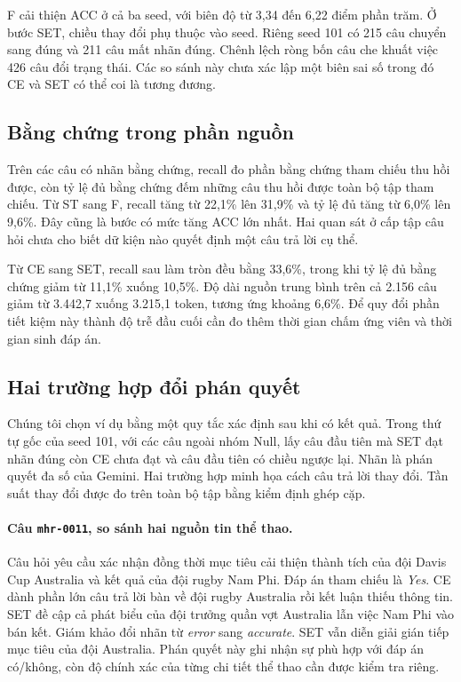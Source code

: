 F cải thiện ACC ở cả ba seed, với biên độ từ 3,34 đến 6,22 điểm phần trăm. Ở bước SET, chiều thay đổi phụ thuộc vào seed. Riêng seed 101 có 215 câu chuyển sang đúng và 211 câu mất nhãn đúng. Chênh lệch ròng bốn câu che khuất việc 426 câu đổi trạng thái. Các so sánh này chưa xác lập một biên sai số trong đó CE và SET có thể coi là tương đương.

\subsection{Bằng chứng trong phần nguồn}
Trên các câu có nhãn bằng chứng, recall đo phần bằng chứng tham chiếu thu hồi được, còn tỷ lệ đủ bằng chứng đếm những câu thu hồi được toàn bộ tập tham chiếu. Từ ST sang F, recall tăng từ 22,1\% lên 31,9\% và tỷ lệ đủ tăng từ 6,0\% lên 9,6\%. Đây cũng là bước có mức tăng ACC lớn nhất. Hai quan sát ở cấp tập câu hỏi chưa cho biết dữ kiện nào quyết định một câu trả lời cụ thể.

Từ CE sang SET, recall sau làm tròn đều bằng 33,6\%, trong khi tỷ lệ đủ bằng chứng giảm từ 11,1\% xuống 10,5\%. Độ dài nguồn trung bình trên cả 2.156 câu giảm từ 3.442,7 xuống 3.215,1 token, tương ứng khoảng 6,6\%. Để quy đổi phần tiết kiệm này thành độ trễ đầu cuối cần đo thêm thời gian chấm ứng viên và thời gian sinh đáp án.

\subsection{Hai trường hợp đổi phán quyết}
Chúng tôi chọn ví dụ bằng một quy tắc xác định sau khi có kết quả. Trong thứ tự gốc của seed 101, với các câu ngoài nhóm Null, lấy câu đầu tiên mà SET đạt nhãn đúng còn CE chưa đạt và câu đầu tiên có chiều ngược lại. Nhãn là phán quyết đa số của Gemini. Hai trường hợp minh họa cách câu trả lời thay đổi. Tần suất thay đổi được đo trên toàn bộ tập bằng kiểm định ghép cặp.

\paragraph{Câu \texttt{mhr-0011}, so sánh hai nguồn tin thể thao.}
Câu hỏi yêu cầu xác nhận đồng thời mục tiêu cải thiện thành tích của đội Davis Cup Australia và kết quả của đội rugby Nam Phi. Đáp án tham chiếu là \emph{Yes}. CE dành phần lớn câu trả lời bàn về đội rugby Australia rồi kết luận thiếu thông tin. SET đề cập cả phát biểu của đội trưởng quần vợt Australia lẫn việc Nam Phi vào bán kết. Giám khảo đổi nhãn từ \emph{error} sang \emph{accurate}. SET vẫn diễn giải gián tiếp mục tiêu của đội Australia. Phán quyết này ghi nhận sự phù hợp với đáp án có/không, còn độ chính xác của từng chi tiết thể thao cần được kiểm tra riêng.

